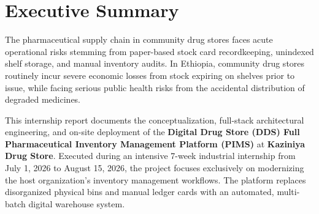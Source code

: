 \chapter*{Executive Summary}

The pharmaceutical supply chain in community drug stores faces acute operational risks stemming from paper-based stock card recordkeeping, unindexed shelf storage, and manual inventory audits. In Ethiopia, community drug stores routinely incur severe economic losses from stock expiring on shelves prior to issue, while facing serious public health risks from the accidental distribution of degraded medicines.

This internship report documents the conceptualization, full-stack architectural engineering, and on-site deployment of the \textbf{Digital Drug Store (DDS) Full Pharmaceutical Inventory Management Platform (PIMS)} at \textbf{Kaziniya Drug Store}. Executed during an intensive 7-week industrial internship from July 1, 2026 to August 15, 2026, the project focuses exclusively on modernizing the host organization's inventory management workflows. The platform replaces disorganized physical bins and manual ledger cards with an automated, multi-batch digital warehouse system.


